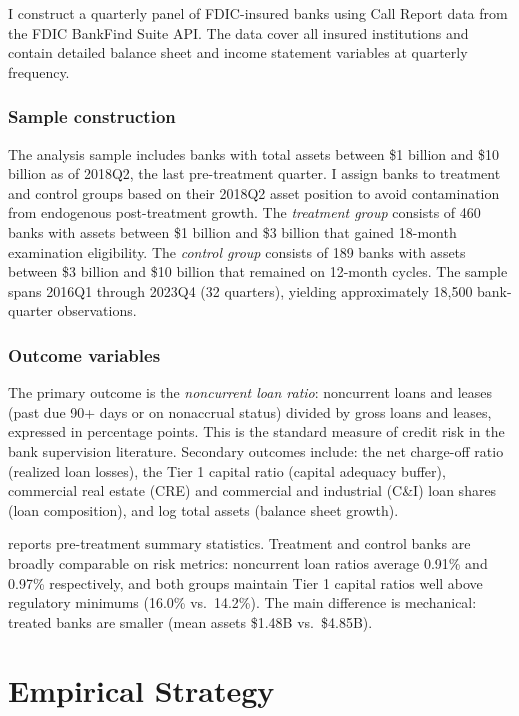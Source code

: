 \documentclass[12pt]{article}
\begin{document}
I construct a quarterly panel of FDIC-insured banks using Call Report data from the FDIC BankFind Suite API. The data cover all insured institutions and contain detailed balance sheet and income statement variables at quarterly frequency.

\subsubsection*{Sample construction} The analysis sample includes banks with total assets between \$1 billion and \$10 billion as of 2018Q2, the last pre-treatment quarter. I assign banks to treatment and control groups based on their 2018Q2 asset position to avoid contamination from endogenous post-treatment growth. The \textit{treatment group} consists of 460 banks with assets between \$1 billion and \$3 billion that gained 18-month examination eligibility. The \textit{control group} consists of 189 banks with assets between \$3 billion and \$10 billion that remained on 12-month cycles. The sample spans 2016Q1 through 2023Q4 (32 quarters), yielding approximately 18,500 bank-quarter observations.

\subsubsection*{Outcome variables} The primary outcome is the \textit{noncurrent loan ratio}: noncurrent loans and leases (past due 90+ days or on nonaccrual status) divided by gross loans and leases, expressed in percentage points. This is the standard measure of credit risk in the bank supervision literature. Secondary outcomes include: the net charge-off ratio (realized loan losses), the Tier 1 capital ratio (capital adequacy buffer), commercial real estate (CRE) and commercial and industrial (C\&I) loan shares (loan composition), and log total assets (balance sheet growth).

 reports pre-treatment summary statistics. Treatment and control banks are broadly comparable on risk metrics: noncurrent loan ratios average 0.91\% and 0.97\% respectively, and both groups maintain Tier 1 capital ratios well above regulatory minimums (16.0\% vs.\ 14.2\%). The main difference is mechanical: treated banks are smaller (mean assets \$1.48B vs.\ \$4.85B).




\section{Empirical Strategy}
\end{document}

